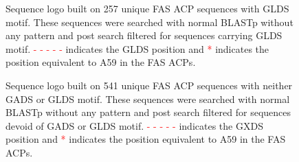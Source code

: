 \begin{singlespacing}
		\setlength\fboxsep{5pt}
		\setlength\fboxrule{1.5pt}
		\begin{figure}
		\centering
		\caption[Sequence logo built on 257 unique FAS ACP sequences with GLDS motif.]{Sequence logo built on 257 unique FAS ACP sequences with GLDS motif. These sequences were searched with normal BLASTp without any pattern and post search filtered for sequences carrying GLDS motif. \textcolor{red}{- - - - -} indicates the GLDS position and \textcolor{red}{*} indicates the position equivalent to A59 in the FAS ACPs.}
		\label{fig:gldsnopattern}
		\end{figure}			

		\setlength\fboxsep{5pt}
		\setlength\fboxrule{1.5pt}
		\begin{figure}
		\centering
		\caption[Sequence logo built on 541 unique FAS ACP sequences with neither GADS or GLDS motif.]{Sequence logo built on 541 unique FAS ACP sequences with neither GADS or GLDS motif. These sequences were searched with normal BLASTp without any pattern and post search filtered for sequences devoid of GADS or GLDS motif. \textcolor{red}{- - - - -} indicates the GXDS position and \textcolor{red}{*} indicates the position equivalent to A59 in the FAS ACPs.}
		\label{fig:neithersnopattern}
		\end{figure}			


							
									
\end{singlespacing}